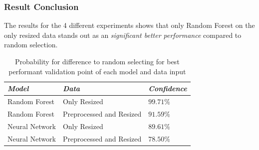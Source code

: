 \subsubsection{Result Conclusion}
The results for the 4 different experiments shows that only Random Forest on the only resized data stands out as an \emph{significant better performance} compared to random selection.

\begin{table}
  \caption{Probability for difference to random selecting for best performant validation point of each model and data input}
  \label{tab:result-conclusion}
  \begin{tabularx}{0.9\linewidth}{|X|X|l|} \hline
    \emph{Model}   & \emph{Data}               & \emph{Confidence} \\ \hline
    Random Forest  & Only Resized              & \(99.71 \%\)      \\ \hline
    Random Forest  & Preprocessed and Resized  & \(91.59 \%\)      \\ \hline
    Neural Network & Only Resized              & \(89.61 \%\)      \\ \hline
    Neural Network & Preprocessed and  Resized & \(78.50 \%\)      \\ \hline
  \end{tabularx}
\end{table}

\label{subsec:evaluation}